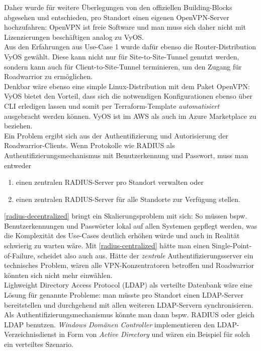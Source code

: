 Daher wurde für weitere Überlegungen von den offiziellen Building-Blocks abgesehen und entschieden, pro Standort einen eigenen OpenVPN-Server hochzufahren: OpenVPN ist freie Software und man muss sich daher nicht mit Lizenzierungen beschäftigen analog zu VyOS.\\
Aus den Erfahrungen aus Use-Case 1 wurde dafür ebenso die Router-Distribution VyOS gewählt. Diese kann nicht nur für Site-to-Site-Tunnel genutzt werden, sondern kann auch für Client-to-Site-Tunnel terminieren, um den Zugang für Roadwarrior zu ermöglichen.\\
Denkbar wäre ebenso eine simple Linux-Distribution mit dem Paket OpenVPN: VyOS bietet den Vorteil, dass sich die notwendigen Konfigurationen ebenso über CLI erledigen lassen und somit per Terraform-Template \textit{automatisiert} ausgebracht werden können\cite{vyosopenvpn2021}. VyOS ist im AWS als auch im Azure Marketplace zu beziehen.\\
Ein Problem ergibt sich aus der Authentifizierung und Autorisierung der Roadwarrior-Clients. Wenn Protokolle wie RADIUS\cite{rfc2865} als Authentifizierungsmechanismus mit Benutzerkennung und Passwort, muss man entweder
\begin{enumerate}[label=(\alph*)]
\item \label{radius-decentralized} einen zentralen RADIUS-Server pro Standort verwalten oder
\item \label{radius-centralized} einen zentralen RADIUS-Server für alle Standorte zur Verfügung stellen.
\end{enumerate}
\ref{radius-decentralized} bringt ein Skalierungsproblem mit sich: So müssen bspw. Benutzerkennungen und Passwörter lokal auf allen Systemen gepflegt werden, was die Komplexität des Use-Cases deutlich erhöhen würde und auch in Realität schwierig zu warten wäre. Mit \ref{radius-centralized} hätte man einen Single-Point-of-Failure, scheidet also auch aus. Hätte der \textit{zentrale} Authentifizierungsserver ein technisches Problem, wären alle VPN-Konzentratoren betroffen und Roadwarrior könnten sich nicht mehr einwählen.\\
Lighweight Directory Access Protocol (LDAP)\cite{rfc4511} als verteilte Datenbank wäre eine Lösung für genannte Probleme: man müsste pro Standort einen LDAP-Server bereitstellen und durchgehend mit allen weiteren LDAP-Servern synchronisieren. Als Authentifizierungsmechanismus könnte man dann bspw. RADIUS\cite{rfc2865} oder gleich LDAP benutzen. \textit{Windows Domänen Controller} implementieren den LDAP-Verzeichnisdienst in Form von \textit{Active Directory} und wären ein Beispiel für solch ein verteiltes Szenario.\cite[S.603-604]{Tanenbaum2003}\\
